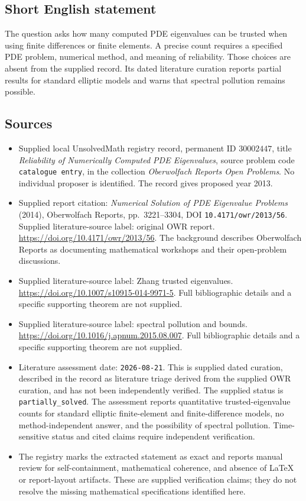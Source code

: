 \documentclass[11pt]{article}
\begin{document}
\subsection{Short English statement}
The question asks how many computed PDE eigenvalues can be trusted when using finite differences or finite elements. A precise count requires a specified PDE problem, numerical method, and meaning of reliability. Those choices are absent from the supplied record. Its dated literature curation reports partial results for standard elliptic models and warns that spectral pollution remains possible.
\subsection{Sources}
\begin{itemize}
\item Supplied local UnsolvedMath registry record, permanent ID \(30002447\), title \emph{Reliability of Numerically Computed PDE Eigenvalues}, source problem code \texttt{catalogue entry}, in the collection \emph{Oberwolfach Reports Open Problems}. No individual proposer is identified. The record gives proposed year 2013.
\item Supplied report citation: \emph{Numerical Solution of PDE Eigenvalue Problems} (2014), Oberwolfach Reports, pp.~3221--3304, DOI \texttt{10.4171/owr/2013/56}. Supplied literature-source label: original OWR report. \url{https://doi.org/10.4171/owr/2013/56}. The background describes Oberwolfach Reports as documenting mathematical workshops and their open-problem discussions.
\item Supplied literature-source label: Zhang trusted eigenvalues. \url{https://doi.org/10.1007/s10915-014-9971-5}. Full bibliographic details and a specific supporting theorem are not supplied.
\item Supplied literature-source label: spectral pollution and bounds. \url{https://doi.org/10.1016/j.apnum.2015.08.007}. Full bibliographic details and a specific supporting theorem are not supplied.
\item Literature assessment date: \texttt{2026-08-21}. This is supplied dated curation, described in the record as literature triage derived from the supplied OWR curation, and has not been independently verified. The supplied status is \texttt{partially\_solved}. The assessment reports quantitative trusted-eigenvalue counts for standard elliptic finite-element and finite-difference models, no method-independent answer, and the possibility of spectral pollution. Time-sensitive status and cited claims require independent verification.
\item The registry marks the extracted statement as exact and reports manual review for self-containment, mathematical coherence, and absence of LaTeX or report-layout artifacts. These are supplied verification claims; they do not resolve the missing mathematical specifications identified here.
\end{itemize}
\end{document}

